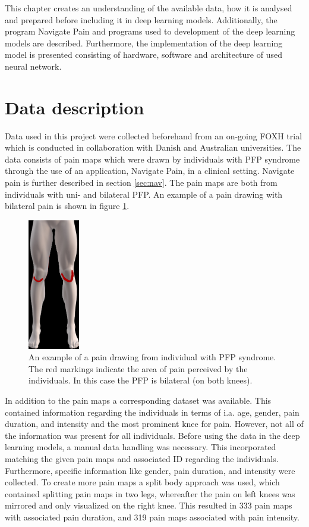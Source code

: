 This chapter creates an understanding of the available data, how it is analysed and prepared before including it in deep learning models. Additionally, the program Navigate Pain and programs used to development of the deep learning models are described. Furthermore, the implementation of the deep learning model is presented consisting of hardware, software and architecture of used neural network.

\section{Data description}
Data used in this project were collected beforehand from an on-going FOXH trial which is conducted in collaboration with Danish and Australian universities. The data consists of pain maps which were drawn by individuals with PFP syndrome through the use of an application, Navigate Pain, in a clinical setting. Navigate pain is further described in section \ref{sec:nav}. The pain maps are both from individuals with uni- and bilateral PFP. An example of a pain drawing with bilateral pain is shown in figure \ref{fig:kneepainmap}.

\begin{figure} [H]
\centering
\includegraphics[width=0.2\textwidth]{figures/kneepainmap}
\caption{An example of a pain drawing from individual with PFP syndrome. The red markings indicate the area of pain perceived by the individuals. In this case the PFP is bilateral (on both knees).}
\label{fig:kneepainmap}
\end{figure}

\noindent
In addition to the pain maps a corresponding dataset was available. This contained information regarding the individuals in terms of i.a. age, gender, pain duration, and intensity and the most prominent knee for pain. However, not all of the information was present for all individuals.
Before using the data in the deep learning models, a manual data handling was necessary. This incorporated matching the given pain maps and associated ID regarding the individuals. Furthermore, specific information like gender, pain duration, and intensity were collected.\newline
\noindent
To create more pain maps a split body approach was used, which contained splitting pain maps in two legs, whereafter the pain on left knees was mirrored and only visualized on the right knee. This resulted in 333 pain maps with associated pain duration, and 319 pain maps associated with pain intensity. 



